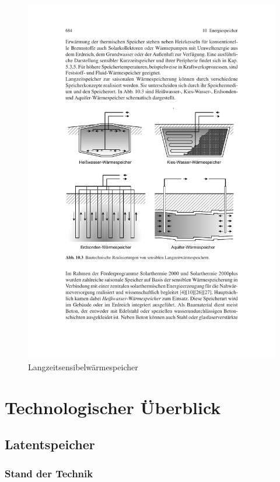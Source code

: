 \documentclass[11pt,a4paper]{scrartcl}
\begin{document}
\begin{figure}[h]
\begin{center}
\includegraphics[scale=1]{images/langzeitspeicher.pdf}
\caption{Langzeitsensibelwärmespeicher \cite{Wesselak}}
\label{fig:Langzeitspeicher}
\end{center}
\end{figure}

\section{Technologischer Überblick}
\subsection{Latentspeicher}
\subsubsection{Stand der Technik}
\end{document}
